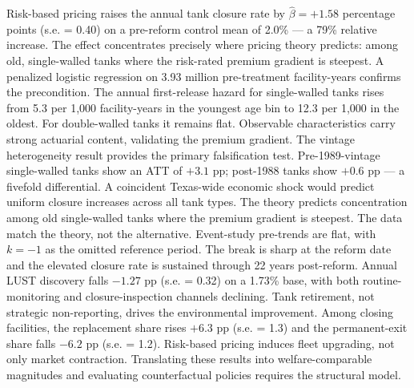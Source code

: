 \documentclass[
  12pt,
]{article}
\begin{document}
Risk-based pricing raises the annual tank closure rate by
\(\hat{\beta} = +1.58\) percentage points (s.e. = 0.40) on a pre-reform
control mean of 2.0\% --- a 79\% relative increase. The effect
concentrates precisely where pricing theory predicts: among old,
single-walled tanks where the risk-rated premium gradient is steepest. A
penalized logistic regression on 3.93 million pre-treatment
facility-years confirms the precondition. The annual first-release
hazard for single-walled tanks rises from 5.3 per 1,000 facility-years
in the youngest age bin to 12.3 per 1,000 in the oldest. For
double-walled tanks it remains flat. Observable characteristics carry
strong actuarial content, validating the premium gradient. The vintage
heterogeneity result provides the primary falsification test.
Pre-1989-vintage single-walled tanks show an ATT of \(+3.1\) pp;
post-1988 tanks show \(+0.6\) pp --- a fivefold differential. A
coincident Texas-wide economic shock would predict uniform closure
increases across all tank types. The theory predicts concentration among
old single-walled tanks where the premium gradient is steepest. The data
match the theory, not the alternative. Event-study pre-trends are flat,
with \(k = -1\) as the omitted reference period. The break is sharp at
the reform date and the elevated closure rate is sustained through 22
years post-reform. Annual LUST discovery falls \(-1.27\) pp (s.e. =
0.32) on a 1.73\% base, with both routine-monitoring and
closure-inspection channels declining. Tank retirement, not strategic
non-reporting, drives the environmental improvement. Among closing
facilities, the replacement share rises \(+6.3\) pp (s.e. = 1.3) and the
permanent-exit share falls \(-6.2\) pp (s.e. = 1.2). Risk-based pricing
induces fleet upgrading, not only market contraction. Translating these
results into welfare-comparable magnitudes and evaluating counterfactual
policies requires the structural model.
\end{document}
